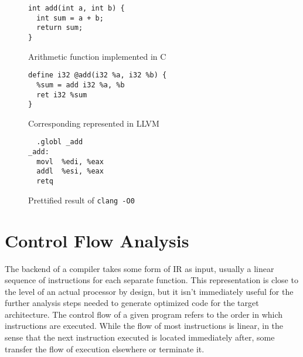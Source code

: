 \documentclass{article}
\begin{document}
\begin{figure}[!ht]
   \begin{minipage}{0.48\textwidth}
     \centering
     \begin{verbatim}
int add(int a, int b) {
  int sum = a + b;
  return sum;
}
     \end{verbatim}
     \caption{Arithmetic function implemented in C}\label{fig:addc}
   \end{minipage}\hfill
   \begin{minipage}{0.48\textwidth}
     \centering
     \begin{verbatim}
define i32 @add(i32 %a, i32 %b) {
  %sum = add i32 %a, %b
  ret i32 %sum
}
     \end{verbatim}
     \caption{Corresponding represented in LLVM}\label{fig:addll}
   \end{minipage}
   \begin{center}
   \begin{minipage}{0.48\textwidth}
     \centering
     \begin{verbatim}
  .globl _add
_add:
  movl	%edi, %eax
  addl	%esi, %eax
  retq
     \end{verbatim}
     \caption{Prettified result of \texttt{clang -O0}}\label{fig:addx86}
   \end{minipage}
   \end{center}
\end{figure}


\section{Control Flow Analysis}



The backend of a compiler takes some form of IR as input, usually a linear sequence of instructions for each separate function. This representation is close to the level of an actual processor by design, but it isn't immediately useful for the further analysis steps needed to generate optimized code for the target architecture. %
The control flow of a given program refers to the order in which instructions are executed. While the flow of most instructions is linear, in the sense that the next instruction executed is located immediately after, some transfer the flow of execution elsewhere or terminate it. %
\end{document}
